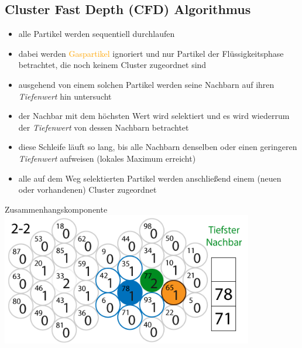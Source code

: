 \documentclass[10pt]{beamer}
\newcommand{\liquid}[1]{\textcolor{blau}{#1}}
\newcommand{\liquidcenter}[1]{\textcolor{blaurot}{#1}}
\newcommand{\wichtig}[1]{\textit{#1}}
\newcommand{\gas}[1]{\textcolor{orange}{#1}}
\begin{document}
\subsection{Cluster Fast Depth (CFD) Algorithmus}
\begin{frame}
	\begin{itemize}
		\item alle Partikel werden sequentiell durchlaufen
		\item dabei werden \gas{Gaspartikel} ignoriert und nur Partikel der \liquid{Flüssigkeitsphase} betrachtet, die noch keinem Cluster zugeordnet sind
		\item ausgehend von einem solchen Partikel werden seine Nachbarn auf ihren \wichtig{Tiefenwert} hin untersucht
		\item der Nachbar mit dem höchsten Wert wird selektiert und es wird wiederrum der \wichtig{Tiefenwert} von dessen Nachbarn betrachtet
		\item diese Schleife läuft so lang, bis alle Nachbarn denselben oder einen geringeren \wichtig{Tiefenwert} aufweisen (\liquidcenter{lokales Maximum} erreicht)
		\item alle auf dem Weg selektierten Partikel werden anschließend einem (neuen oder vorhandenen) Cluster zugeordnet
	\end{itemize}
\end{frame}

\begin{frame}{Zusammenhangskomponente}
	\includegraphics*[width=11cm]{media/cluster/cfd.png} \\
\end{frame}
\end{document}
